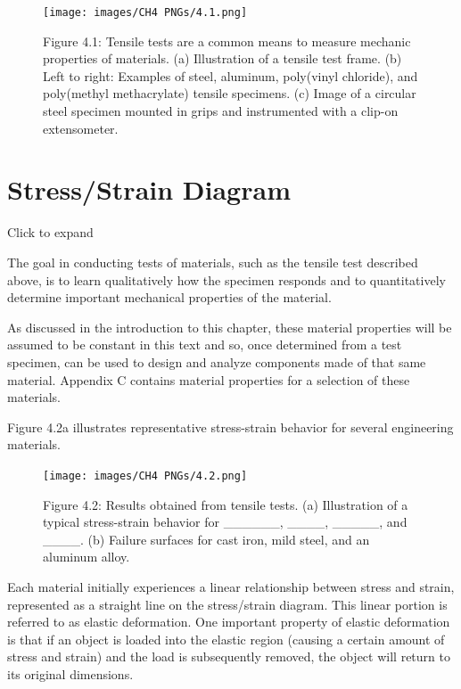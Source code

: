 \documentclass[
  letterpaper,
  DIV=11,
  numbers=noendperiod]{scrreprt}
\begin{document}
\begin{figure}[H]

{\centering \texttt{[image: images/CH4 PNGs/4.1.png]}

}

\caption{Figure 4.1: Tensile tests are a common means to measure
mechanic properties of materials. (a) Illustration of a tensile test
frame. (b) Left to right: Examples of steel, aluminum, poly(vinyl
chloride), and poly(methyl methacrylate) tensile specimens. (c) Image of
a circular steel specimen mounted in grips and instrumented with a
clip-on extensometer.}

\end{figure}%

\section{Stress/Strain Diagram}\label{sec-4.2}

Click to expand

The goal in conducting tests of materials, such as the tensile test
described above, is to learn qualitatively how the specimen responds and
to quantitatively determine important mechanical properties of the
material.

As discussed in the introduction to this chapter, these material
properties will be assumed to be constant in this text and so, once
determined from a test specimen, can be used to design and analyze
components made of that same material. Appendix C contains material
properties for a selection of these materials.

Figure 4.2a illustrates representative stress-strain behavior for
several engineering materials.

\begin{figure}[H]

{\centering \texttt{[image: images/CH4 PNGs/4.2.png]}

}

\caption{Figure 4.2: Results obtained from tensile tests. (a)
Illustration of a typical stress-strain behavior for \_\_\_\_\_\_,
\_\_\_\_, \_\_\_\_\_, and \_\_\_\_. (b) Failure surfaces for cast iron,
mild steel, and an aluminum alloy.}

\end{figure}%

Each material initially experiences a linear relationship between stress
and strain, represented as a straight line on the stress/strain diagram.
This linear portion is referred to as elastic deformation. One important
property of elastic deformation is that if an object is loaded into the
elastic region (causing a certain amount of stress and strain) and the
load is subsequently removed, the object will return to its original
dimensions.
\end{document}
